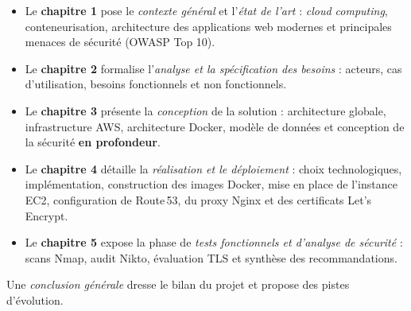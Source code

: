 \begin{itemize}
  \item Le \textbf{chapitre 1} pose le \textit{contexte général} et
        l'\textit{état de l'art} : \emph{cloud computing},
        conteneurisation, architecture des applications web modernes
        et principales menaces de sécurité (OWASP Top 10).
  \item Le \textbf{chapitre 2} formalise l'\textit{analyse et la
        spécification des besoins} : acteurs, cas d'utilisation,
        besoins fonctionnels et non fonctionnels.
  \item Le \textbf{chapitre 3} présente la \textit{conception} de la
        solution : architecture globale, infrastructure AWS,
        architecture Docker, modèle de données et conception de la
        sécurité \textbf{en profondeur}.
  \item Le \textbf{chapitre 4} détaille la \textit{réalisation et le
        déploiement} : choix technologiques, implémentation,
        construction des images Docker, mise en place de l'instance
        EC2, configuration de Route\,53, du proxy Nginx et des
        certificats Let's Encrypt.
  \item Le \textbf{chapitre 5} expose la phase de \textit{tests
        fonctionnels et d'analyse de sécurité} : scans Nmap, audit
        Nikto, évaluation TLS et synthèse des recommandations.
\end{itemize}

Une \textit{conclusion générale} dresse le bilan du projet et propose
des pistes d'évolution.
